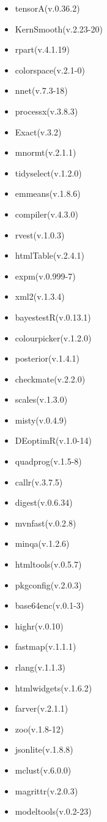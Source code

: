 \documentclass[
]{article}
\begin{document}
\begin{itemize}
\item
  tensorA(v.0.36.2)
\item
  KernSmooth(v.2.23-20)
\item
  rpart(v.4.1.19)
\item
  colorspace(v.2.1-0)
\item
  nnet(v.7.3-18)
\item
  processx(v.3.8.3)
\item
  Exact(v.3.2)
\item
  mnormt(v.2.1.1)
\item
  tidyselect(v.1.2.0)
\item
  emmeans(v.1.8.6)
\item
  compiler(v.4.3.0)
\item
  rvest(v.1.0.3)
\item
  htmlTable(v.2.4.1)
\item
  expm(v.0.999-7)
\item
  xml2(v.1.3.4)
\item
  bayestestR(v.0.13.1)
\item
  colourpicker(v.1.2.0)
\item
  posterior(v.1.4.1)
\item
  checkmate(v.2.2.0)
\item
  scales(v.1.3.0)
\item
  misty(v.0.4.9)
\item
  DEoptimR(v.1.0-14)
\item
  quadprog(v.1.5-8)
\item
  callr(v.3.7.5)
\item
  digest(v.0.6.34)
\item
  mvnfast(v.0.2.8)
\item
  minqa(v.1.2.6)
\item
  htmltools(v.0.5.7)
\item
  pkgconfig(v.2.0.3)
\item
  base64enc(v.0.1-3)
\item
  highr(v.0.10)
\item
  fastmap(v.1.1.1)
\item
  rlang(v.1.1.3)
\item
  htmlwidgets(v.1.6.2)
\item
  farver(v.2.1.1)
\item
  zoo(v.1.8-12)
\item
  jsonlite(v.1.8.8)
\item
  mclust(v.6.0.0)
\item
  magrittr(v.2.0.3)
\item
  modeltools(v.0.2-23)

\end{itemize}
\end{document}
